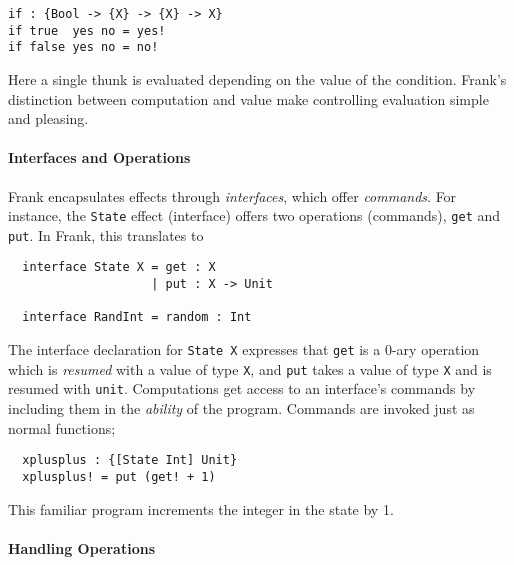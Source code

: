 \documentclass[msc,deptreport,cs]{infthesis} %
\newcommand{\code}[1]{\lstinline{#1}}
\newcommand{\todo}[1]
           {{\par\noindent\small\color{RoyalPurple}
  \framebox{\parbox{\dimexpr\linewidth-2\fboxsep-2\fboxrule}
    {\textbf{TODO:} #1}}}}
\begin{document}
\begin{lstlisting}
if : {Bool -> {X} -> {X} -> X}
if true  yes no = yes!
if false yes no = no!
\end{lstlisting}

\noindent Here a single thunk is evaluated depending on the value of the
condition. Frank's distinction between computation and value make controlling
evaluation simple and pleasing.



\paragraph*{Interfaces and Operations}

Frank encapsulates effects through \emph{interfaces}, which offer
\emph{commands}. For instance, the \code{State} effect (interface) offers two
operations (commands), \code{get} and \code{put}. In Frank, this translates to

\begin{lstlisting}
  interface State X = get : X
                    | put : X -> Unit

  interface RandInt = random : Int
\end{lstlisting}

The interface declaration for \code{State X} expresses that \code{get} is a
0-ary operation which is \emph{resumed} with a value of type \code{X}, and
\code{put} takes a value of type \code{X} and is resumed with \code{unit}.
Computations get access to an interface's commands by including them in the
\emph{ability} of the program. Commands are invoked just as normal functions;

\begin{lstlisting}
  xplusplus : {[State Int] Unit}
  xplusplus! = put (get! + 1)
\end{lstlisting}

\noindent This familiar program increments the integer in the state by 1.

\paragraph*{Handling Operations}
\end{document}
